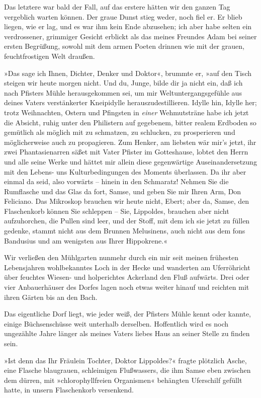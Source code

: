 Das letztere war bald der Fall, auf das erstere hätten wir den
ganzen Tag vergeblich warten können. Der graue Dunst stieg weder,
noch fiel er. Er blieb liegen, wie er lag, und es war ihm kein Ende
abzusehen; ich aber habe selten ein verdrossener, grimmiger Gesicht
erblickt als das meines Freundes Adam bei seiner ersten Begrüßung,
sowohl mit dem armen Poeten drinnen wie mit der grauen,
feuchtfrostigen Welt draußen.

»Das sage ich Ihnen, Dichter, Denker und Doktor«, brummte er, »auf
den Tisch steigen wir heute morgen nicht. Und du, Junge, bilde dir
ja nicht ein, daß ich nach Pfisters Mühle herausgekommen sei, um
mir Weltuntergangsgefühle aus deines Vaters verstänkerter
Kneipidylle herauszudestillieren. Idylle hin, Idylle her; trotz
Weihnachten, Ostern und Pfingsten in \emph{einer} Wehmutsträne habe
ich jetzt die Absicht, ruhig unter den Philistern auf gegebenem,
bitter realem Erdboden so gemütlich als möglich mit zu schmatzen,
zu schlucken, zu prosperieren und möglicherweise auch zu
propagieren. Zum Henker, am liebsten wär mir's jetzt, ihr zwei
Phantasienarren säßet mit Vater Pfister im Gotteshause, lobtet den
Herrn und alle seine Werke und hättet mir allein diese gegenwärtige
Auseinandersetzung mit den Lebens- uns Kulturbedingungen des
Moments überlassen. Da ihr aber einmal da seid, also vorwärts –
hinein in den Schmaratz! Nehmen Sie die Rumflasche und das Glas da
fort, Samse, und geben Sie mir Ihren Arm, Don Feliciano. Das
Mikroskop brauchen wir heute nicht, Ebert; aber da, Samse, den
Flaschenkorb können Sie schleppen – Sie, Lippoldes, brauchen aber
nicht aufzuhorchen, die Pullen sind leer, und der Stoff, mit dem
ich sie jetzt zu füllen gedenke, stammt nicht aus dem Brunnen
Melusinens, auch nicht aus dem fons Bandusius und am wenigsten aus
Ihrer Hippokrene.«

Wir verließen den Mühlgarten nunmehr durch ein mir seit meinen
frühesten Lebensjahren wohlbekanntes Loch in der Hecke und
wanderten am Uferröhricht über feuchtes Wiesen- und holperichtes
Ackerland den Fluß aufwärts. Drei oder vier Anbauerhäuser des
Dorfes lagen noch etwas weiter hinauf und reichten mit ihren Gärten
bis an den Bach.

Das eigentliche Dorf liegt, wie jeder weiß, der Pfisters Mühle
kennt oder kannte, einige Büchsenschüsse weit unterhalb derselben.
Hoffentlich wird es noch ungezählte Jahre länger als meines Vaters
liebes Haus an seiner Stelle zu finden sein.

»Ist denn das Ihr Fräulein Tochter, Doktor Lippoldes?« fragte
plötzlich Asche, eine Flasche blaugrauen, schleimigen Flußwassers,
die ihm Samse eben zwischen dem dürren, mit »chlorophyllfreien
Organismen« behängten Uferschilf gefüllt hatte, in unsern
Flaschenkorb versenkend.

